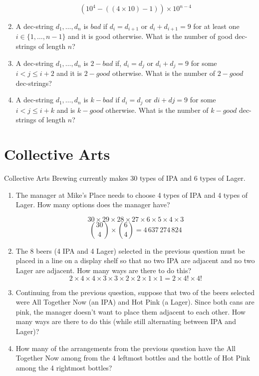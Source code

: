 \documentclass{article}
\begin{document}
\begin{enumerate}
   \[
      (10^4 - ((4 \times 10) - 1)) \times 10^{n-4}
   \] 

   \item A dec-string $d_1,\ldots,d_n$ is $bad$ if $d_i=d_{i+1}$ or $d_i+d_{i+1}=9$ for at least one $i\in\{1,\ldots,n-1\}$ and it is good otherwise. What is the number of good dec-strings of length $n$?
   
   \item A dec-string $d_1,\ldots,d_n$ is $2-bad$ if, $d_i=d_j$ or $d_i+d_j=9$ for some $i<j \leq i+2$ and it is $2-good$ otherwise. What is the number of $2-good$ dec-strings?
   
   \item A dec-string $d_1,\ldots,d_n$ is $k-bad$ if $d_i=d_j$ or $di+dj=9$ for some $i<j \leq i+k$ and is $k-good$ otherwise. What is the number of $k-good$ dec-strings of length $n$?

\end{enumerate}

\section{Collective Arts}

Collective Arts Brewing currently makes 30 types of IPA and 6 types of Lager.

\begin{enumerate}

   \item The manager at Mike's Place needs to choose 4 types of IPA and 4 types of Lager. How many options does the manager have?

   \[
     30\times 29\times 28\times 27\times 
     6\times 5\times 4\times 3
   \]
   \[
      \binom{30}{4}\times \binom{6}{4} = 4\,637\,274\,824
   \]
   \item The 8 beers (4 IPA and 4 Lager) selected in the previous question must be placed in a line on a display shelf so that no two IPA are adjacent and no two Lager are adjacent. How many ways are there to do this?
   \[
      2 \times 4 \times 4 \times 3 \times 3 \times 2 \times 2 \times 1 \times 1 = 2 \times 4! \times 4!
   \]
   \item Continuing from the previous question, suppose that two of the beers selected were All Together Now (an IPA) and Hot Pink (a Lager). Since both cans are pink, the manager doesn't want to place them adjacent to each other. How many ways are there to do this (while still alternating between IPA and Lager)?
   
   \item How many of the arrangements from the previous question have the All Together Now among from the 4 leftmost bottles and the bottle of Hot Pink among the 4 rightmost bottles?

\end{enumerate}
\end{document}
